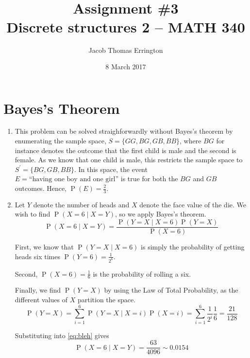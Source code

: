 \documentclass[letterpaper,11pt]{article}
\author{Jacob Thomas Errington}
\title{Assignment \#3\\Discrete structures 2 -- MATH 340}
\date{8 March 2017}
\DeclareMathOperator{\Prob}{P}
\renewcommand{\P}[1]{\Prob{\parens{#1}}}
\newcommand{\parens}[1]{\left(#1\right)}
\newcommand{\given}{\;\vert\;}
\newcommand{\question}{\section}
\begin{document}
\maketitle

\question{Bayes's Theorem}

\begin{enumerate}
    \item
        This problem can be solved straighforwardly without Bayes's theorem
        by enumerating the sample space, $S = \{GG, BG, GB, BB\}$, where $BG$
        for instance denotes the outcome that the first child is male and the
        second is female. As we know that one child is male, this restricts the
        sample space to $S^\prime = \{BG, GB, BB\}$. In this space, the event
        $E = \text{``having one boy and one girl''}$ is true for both the $BG$
        and $GB$ outcomes.
        Hence, $\P{E} = \frac{2}{3}$.

    \item
        Let $Y$ denote the number of heads and $X$ denote the face value of the
        die. We wish to find $\P{X = 6 \given X = Y}$, so we apply Bayes's
        theorem.
        \begin{equation}
            \label{eq:bleh}
            \P{X = 6 \given X = Y} = \frac{
                \P{Y = X \given X = 6} \P{Y = X}
            }{
                \P{X = 6}
            }
        \end{equation}

        First, we know that $\P{Y = X \given X = 6}$ is simply the probability
        of getting heads six times $\P{Y = 6} = \frac{1}{2^6}$.

        Second, $\P{X = 6} = \frac{1}{6}$ is the probability of rolling a six.

        Finally, we find $\P{Y = X}$ by using the Law of Total Probability, as
        the different values of $X$ partition the space.
        \begin{equation*}
            \P{Y = X} = \sum_{i = 1}^6 {
                \P{Y = X \given X = i} \P{X = i}
            }
            =
            \sum_{i=1}^6 {
                \frac{1}{2^i} \frac{1}{6}
            }
            = \frac{21}{128}
        \end{equation*}

        Substituting into \eqref{eq:bleh} gives
        \begin{equation*}
            \P{X = 6 \given X = Y}
            = \frac{63}{4096} \sim 0.0154
        \end{equation*}


\end{enumerate}
\end{document}
